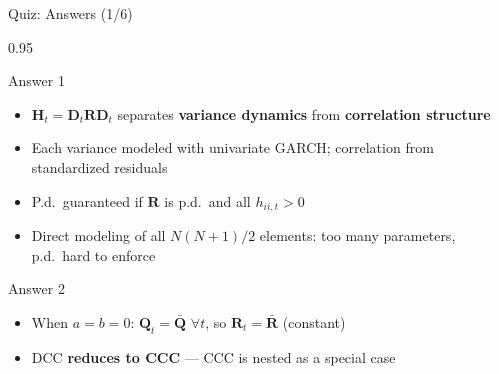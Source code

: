 \documentclass[9pt, aspectratio=169, t]{beamer}
\begin{document}
\begin{frame}{Quiz: Answers (1/6)}
    \begin{cminipage}{0.95\textwidth}
    {\scriptsize
    \begin{exampleblock}{Answer 1}
        \begin{itemize}\setlength{\itemsep}{0pt}
            \item $\mathbf{H}_t = \mathbf{D}_t\mathbf{R}\mathbf{D}_t$ separates \textbf{variance dynamics} from \textbf{correlation structure}
            \item Each variance modeled with univariate GARCH; correlation from standardized residuals
            \item P.d.\ guaranteed if $\mathbf{R}$ is p.d.\ and all $h_{ii,t} > 0$
            \item Direct modeling of all $N(N+1)/2$ elements: too many parameters, p.d.\ hard to enforce
        \end{itemize}
    \end{exampleblock}
    \begin{exampleblock}{Answer 2}
        \begin{itemize}\setlength{\itemsep}{0pt}
            \item When $a = b = 0$: $\mathbf{Q}_t = \bar{\mathbf{Q}}$ $\forall t$, so $\mathbf{R}_t = \bar{\mathbf{R}}$ (constant)
            \item DCC \textbf{reduces to CCC} --- CCC is nested as a special case
        \end{itemize}
    \end{exampleblock}
    }
    \end{cminipage}
\end{frame}
\end{document}

